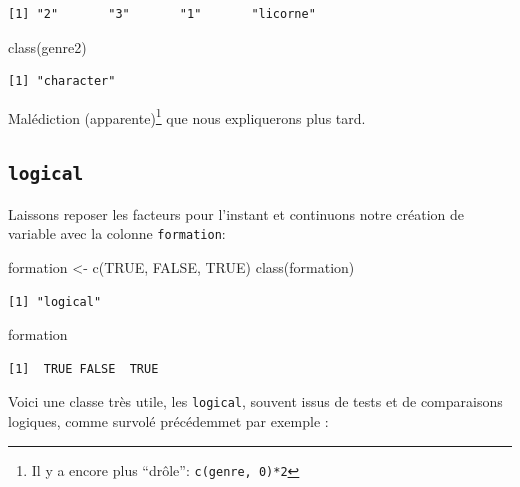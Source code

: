 \documentclass[
  letterpaper,
  DIV=11,
  numbers=noendperiod]{scrreprt}
\newenvironment{Shaded}{\begin{snugshade}}{\end{snugshade}}
\newcommand{\ConstantTok}[1]{\textcolor[rgb]{0.56,0.35,0.01}{#1}}
\newcommand{\FunctionTok}[1]{\textcolor[rgb]{0.28,0.35,0.67}{#1}}
\newcommand{\NormalTok}[1]{\textcolor[rgb]{0.00,0.23,0.31}{#1}}
\newcommand{\OtherTok}[1]{\textcolor[rgb]{0.00,0.23,0.31}{#1}}
\begin{document}
\begin{verbatim}
[1] "2"       "3"       "1"       "licorne"
\end{verbatim}

\begin{Shaded}
\begin{Highlighting}[]
\FunctionTok{class}\NormalTok{(genre2)}
\end{Highlighting}
\end{Shaded}

\begin{verbatim}
[1] "character"
\end{verbatim}

Malédiction (apparente)\footnote{Il y a encore plus ``drôle'':
  \texttt{c(genre,\ 0)*2}} que nous expliquerons plus tard.

\hypertarget{logical}{%
\subsection{\texorpdfstring{\texttt{logical}}{logical}}\label{logical}}

Laissons reposer les facteurs pour l'instant et continuons notre
création de variable avec la colonne \texttt{formation}:

\begin{Shaded}
\begin{Highlighting}[]
\NormalTok{formation }\OtherTok{\textless{}{-}} \FunctionTok{c}\NormalTok{(}\ConstantTok{TRUE}\NormalTok{, }\ConstantTok{FALSE}\NormalTok{, }\ConstantTok{TRUE}\NormalTok{)}
\FunctionTok{class}\NormalTok{(formation)}
\end{Highlighting}
\end{Shaded}

\begin{verbatim}
[1] "logical"
\end{verbatim}

\begin{Shaded}
\begin{Highlighting}[]
\NormalTok{formation}
\end{Highlighting}
\end{Shaded}

\begin{verbatim}
[1]  TRUE FALSE  TRUE
\end{verbatim}

Voici une classe très utile, les \texttt{logical}, souvent issus de
tests et de comparaisons logiques, comme survolé précédemmet par exemple
:
\end{document}
